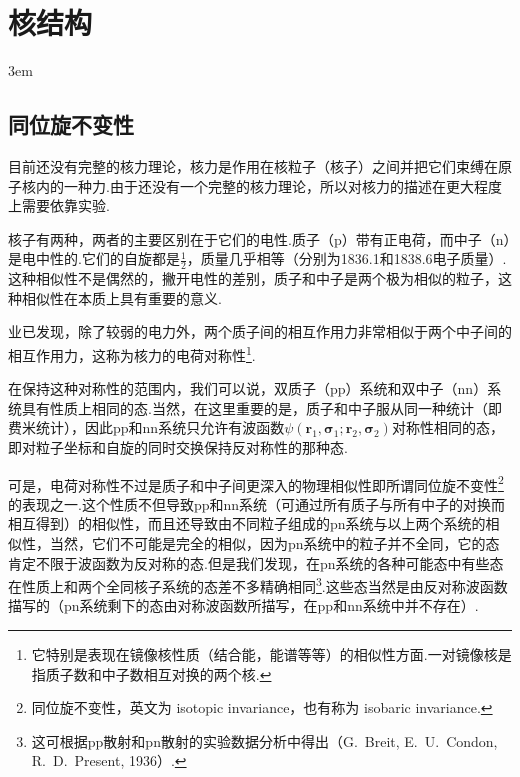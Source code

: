 \chapter{核结构}
\emergencystretch 3em

\section{同位旋不变性}

目前还没有完整的核力理论，核力是作用在核粒子（核子）之间并把它们束缚在原子核内的一种力.由于还没有一个完整的核力理论，所以对核力的描述在更大程度上需要依靠实验.

核子有两种，两者的主要区别在于它们的电性.质子（p）带有正电荷，而中子（n）是电中性的.它们的自旋都是$\frac{1}{2}$，质量几乎相等（分别为1836.1和1838.6电子质量）.这种相似性不是偶然的，撇开电性的差别，质子和中子是两个极为相似的粒子，这种相似性在本质上具有重要的意义.

业已发现，除了较弱的电力外，两个质子间的相互作用力非常相似于两个中子间的相互作用力，这称为核力的电荷对称性\footnote{它特别是表现在镜像核性质（结合能，能谱等等）的相似性方面.一对镜像核是指质子数和中子数相互对换的两个核.}.

在保持这种对称性的范围内，我们可以说，双质子（pp）系统和双中子（nn）系统具有性质上相同的态.当然，在这里重要的是，质子和中子服从同一种统计（即费米统计），因此pp和nn系统只允许有波函数$\psi(\boldsymbol{r}_1,\boldsymbol{\sigma}_1;\boldsymbol{r}_2,\boldsymbol{\sigma}_2)$对称性相同的态，即对粒子坐标和自旋的同时交换保持反对称性的那种态.

可是，电荷对称性不过是质子和中子间更深入的物理相似性即所谓同位旋不变性\footnote{同位旋不变性，英文为 isotopic invariance，也有称为 isobaric invariance.}的表现之一.这个性质不但导致pp和nn系统（可通过所有质子与所有中子的对换而相互得到）的相似性，而且还导致由不同粒子组成的pn系统与以上两个系统的相似性，当然，它们不可能是完全的相似，因为pn系统中的粒子并不全同，它的态肯定不限于波函数为反对称的态.但是我们发现，在pn系统的各种可能态中有些态在性质上和两个全同核子系统的态差不多精确相同\footnote{这可根据pp散射和pn散射的实验数据分析中得出（G.~Breit, E.~U.~Condon, R.~D.~Present, 1936）.}.这些态当然是由反对称波函数描写的（pn系统剩下的态由对称波函数所描写，在pp和nn系统中并不存在）.

